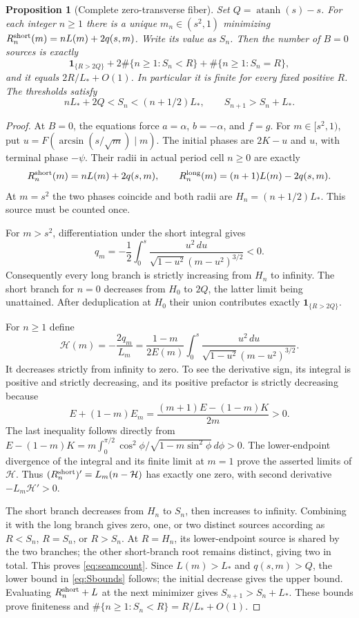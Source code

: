 \documentclass[11pt,a4paper]{article}
\newtheorem{proposition}[theorem]{Proposition}
\theoremstyle{remark}\newtheorem{remark}[theorem]{Remark}
\newcommand{\atanh}{\operatorname{atanh}}
\newcommand{\ind}{\mathbf{1}}
\begin{document}
\begin{proposition}[Complete zero-transverse fiber]\label{prop:seam}
Set $Q=\atanh(s)-s$. For each integer $n\ge1$ there is a unique
$m_n\in(s^2,1)$ minimizing
$R_n^{\rm short}(m)=nL(m)+2q(s,m)$. Write its value as $S_n$.
Then the number of $B=0$ sources is exactly
\begin{equation}\label{eq:seamcount}
 \ind_{\{R>2Q\}}+2\#\{n\ge1:S_n<R\}+\#\{n\ge1:S_n=R\},
\end{equation}
and it equals $2R/L_*+O(1)$. In particular it is finite for every
fixed positive $R$. The thresholds satisfy
\begin{equation}\label{eq:Sbounds}
 nL_*+2Q<S_n<(n+1/2)L_*,\qquad S_{n+1}>S_n+L_*.
\end{equation}
\end{proposition}
\begin{proof}
At $B=0$, the equations force $a=\alpha$, $b=-\alpha$, and
$f=g$. For $m\in[s^2,1)$, put
$u=F(\arcsin(s/\sqrt m)\mid m)$.
The initial phases are $2K-u$ and $u$, with terminal phase $-\psi$.
Their radii in actual period cell $n\ge0$ are exactly
\begin{equation}\label{eq:seambranches}
 R_n^{\rm short}(m)=nL(m)+2q(s,m),\qquad
 R_n^{\rm long}(m)=(n+1)L(m)-2q(s,m).
\end{equation}
At $m=s^2$ the two phases coincide and both radii are
$H_n=(n+1/2)L_*$. This source must be counted once.

For $m>s^2$, differentiation under the short integral gives
\[
 q_m=-\frac12\int_0^s
 \frac{u^2\,du}{\sqrt{1-u^2}(m-u^2)^{3/2}}<0.
\]
Consequently every long branch is strictly increasing from $H_n$ to
infinity. The short branch for $n=0$ decreases from $H_0$ to $2Q$,
the latter limit being unattained. After deduplication at $H_0$ their
union contributes exactly $\ind_{\{R>2Q\}}$.

For $n\ge1$ define
\[
 \mathcal H(m)=-\frac{2q_m}{L_m}
 =\frac{1-m}{2E(m)}\int_0^s
 \frac{u^2\,du}{\sqrt{1-u^2}(m-u^2)^{3/2}}.
\]
It decreases strictly from infinity to zero. To see the derivative
sign, its integral is positive and strictly decreasing, and its positive
prefactor is strictly decreasing because
\[
 E+(1-m)E_m=\frac{(m+1)E-(1-m)K}{2m}>0.
\]
The last inequality follows directly from
$E-(1-m)K=m\int_0^{\pi/2}\cos^2\phi/
\sqrt{1-m\sin^2\phi}\,d\phi>0$.
The lower-endpoint divergence of the integral and its finite limit at
$m=1$ prove the asserted limits of $\mathcal H$.
Thus $(R_n^{\rm short})'=L_m(n-\mathcal H)$ has exactly one zero,
with second derivative $-L_m\mathcal H'>0$.

The short branch decreases from $H_n$ to $S_n$, then increases to
infinity. Combining it with the long branch gives zero, one, or two
distinct sources according as $R<S_n$, $R=S_n$, or $R>S_n$.
At $R=H_n$, its lower-endpoint source is shared by the two branches;
the other short-branch root remains distinct, giving two in total.
This proves \eqref{eq:seamcount}.
Since $L(m)>L_*$ and $q(s,m)>Q$, the lower bound in
\eqref{eq:Sbounds} follows; the initial decrease gives the upper bound.
Evaluating $R_n^{\rm short}+L$ at the next minimizer gives
$S_{n+1}>S_n+L_*$. These bounds prove finiteness and
$\#\{n\ge1:S_n<R\}=R/L_*+O(1)$.
\end{proof}
\end{document}
